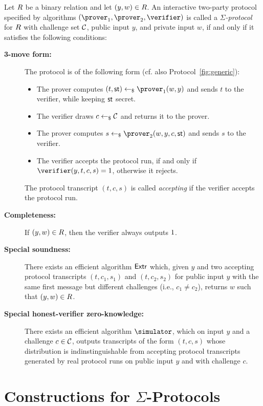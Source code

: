 \documentclass[runningheads]{llncs}
\begin{document}
\begin{definition}
  Let $R$ be a binary relation and let $(y,w)\in R$.
  An interactive two-party protocol specified by algorithms $(\prover_1,\prover_2,\verifier)$ is called a \emph{$\Sigma$-protocol} for $R$ with challenge set $\mathcal{C}$, public input $y$, and private input $w$, if and only if it satisfies the following conditions:
  \begin{description}
    \item[\bf 3-move form:]
      The protocol is of the following form (cf. also Protocol~\ref{fig:generic}):
      \begin{itemize}
        \item
          The prover computes $(t,\st) \getsr \prover_1(w,y)$ and sends $t$ to the verifier, while keeping $\mathsf{st}$ secret.
        \item
          The verifier draws $c\gets_{\$}\mathcal{C}$ and returns it to the prover.
        \item
          The prover computes $s\getsr\prover_2(w,y,c,\st)$ and sends $s$ to the verifier.
        \item
          The verifier accepts the protocol run, if and only if $\verifier(y,t,c,s)=\accept$, otherwise it rejects.
      \end{itemize}
      The protocol transcript $(t,c,s)$ is called \emph{accepting} if the verifier accepts the protocol run.
    \item[\bf Completeness:]
      If $(y,w)\in R$, then the verifier always outputs $1$.
    \item[\bf Special soundness:]
      There exists an efficient algorithm $\mathsf{Extr}$ which, given $y$ and two accepting protocol transcripts $(t,c_1,s_1)$ and $(t,c_2,s_2)$ for public input $y$ with the same first message but different challenges (i.e., $c_1\ne c_2$), returns $w$ such that $(y,w)\in R$.
    \item[\bf Special honest-verifier zero-knowledge:]
      There exists an efficient algorithm $\simulator$, which on input $y$ and a challenge $c\in\mathcal{C}$, outputs transcripts of the form $(t,c,s)$ whose distribution is indinstinguishable from accepting protocol transcripts generated by real protocol runs on public input $y$ and with challenge $c$.
  \end{description}
\end{definition}

\section{Constructions for $\Sigma$-Protocols}
\end{document}
